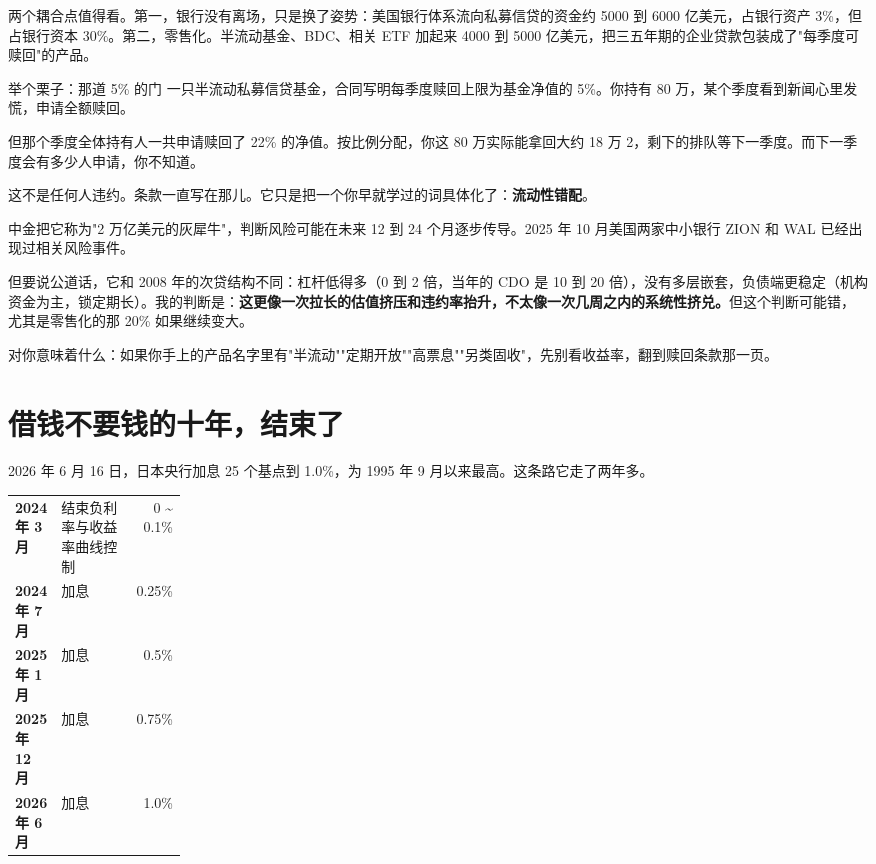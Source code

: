 两个耦合点值得看。第一，银行没有离场，只是换了姿势：美国银行体系流向私募信贷的资金约 5000 到 6000 亿美元，占银行资产 3\%，但占银行资本 30\%。第二，零售化。半流动基金、BDC、相关 ETF 加起来 4000 到 5000 亿美元，把三五年期的企业贷款包装成了"每季度可赎回"的产品。

\begin{egbox}{举个栗子：那道 5\% 的门}
一只半流动私募信贷基金，合同写明每季度赎回上限为基金净值的 5\%。你持有 80 万，某个季度看到新闻心里发慌，申请全额赎回。

但那个季度全体持有人一共申请赎回了 22\% 的净值。按比例分配，你这 80 万实际能拿回大约 18 万 2，剩下的排队等下一季度。而下一季度会有多少人申请，你不知道。

这不是任何人违约。条款一直写在那儿。它只是把一个你早就学过的词具体化了：\textbf{流动性错配}。

\end{egbox}

中金把它称为"2 万亿美元的灰犀牛"，判断风险可能在未来 12 到 24 个月逐步传导。2025 年 10 月美国两家中小银行 ZION 和 WAL 已经出现过相关风险事件。

但要说公道话，它和 2008 年的次贷结构不同：杠杆低得多（0 到 2 倍，当年的 CDO 是 10 到 20 倍），没有多层嵌套，负债端更稳定（机构资金为主，锁定期长）。我的判断是：\textbf{这更像一次拉长的估值挤压和违约率抬升，不太像一次几周之内的系统性挤兑。}但这个判断可能错，尤其是零售化的那 20\% 如果继续变大。

对你意味着什么：如果你手上的产品名字里有"半流动""定期开放""高票息""另类固收"，先别看收益率，翻到赎回条款那一页。

\section{借钱不要钱的十年，结束了}

2026 年 6 月 16 日，日本央行加息 25 个基点到 1.0\%，为 1995 年 9 月以来最高。这条路它走了两年多。

\begin{tablewrap}
\begin{xltabular}{\linewidth}{>{\raggedright\arraybackslash}p{0.20\linewidth}Xr}
\toprule
{} &  &  \\
\midrule
\textbf{2024 年 3 月} & 结束负利率与收益率曲线控制 & 0 \textasciitilde{} 0.1\% \\
\textbf{2024 年 7 月} & 加息 & 0.25\% \\
\textbf{2025 年 1 月} & 加息 & 0.5\% \\
\textbf{2025 年 12 月} & 加息 & 0.75\% \\
\textbf{2026 年 6 月} & 加息 & 1.0\% \\
\bottomrule
\end{xltabular}
\end{tablewrap}

